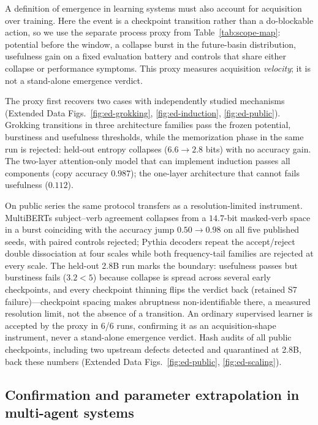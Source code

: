 \documentclass[11pt]{article}
\theoremstyle{definition}
\begin{document}
A definition of emergence in learning systems must also account for
acquisition over training. Here the event is a checkpoint transition rather
than a do-blockable action, so we use the separate process proxy from
Table~\ref{tab:scope-map}: potential before the window, a collapse burst in
the future-basin distribution, usefulness gain on a fixed evaluation
battery and controls that share either collapse or performance symptoms.
This proxy measures acquisition \emph{velocity}; it is not a stand-alone
emergence verdict.

The proxy first recovers two cases with independently studied
mechanisms (Extended Data Figs.~\ref{fig:ed-grokking},
\ref{fig:ed-induction}, \ref{fig:ed-public}). Grokking transitions in
three architecture families pass the frozen potential, burstiness and
usefulness thresholds, while the memorization phase in the same run is
rejected: held-out entropy collapses ($6.6\to2.8$ bits) with no
accuracy gain. The two-layer attention-only model that can implement
induction passes all components (copy accuracy $0.987$); the one-layer
architecture that cannot fails usefulness ($0.112$).

On public series the same protocol transfers as a resolution-limited
instrument. MultiBERTs subject--verb agreement collapses from a
$14.7$-bit masked-verb space in a burst coinciding with the accuracy
jump $0.50\to0.98$ on all five published seeds, with paired controls
rejected; Pythia decoders repeat the accept/reject double dissociation
at four scales while both frequency-tail families are rejected at
every scale. The held-out 2.8B run marks the boundary: usefulness
passes but burstiness fails ($3.2<5$) because collapse is spread
across several early checkpoints, and every checkpoint thinning flips
the verdict back (retained S7 failure)---checkpoint spacing makes
abruptness non-identifiable there, a measured resolution limit, not
the absence of a transition. An ordinary supervised learner is
accepted by the proxy in 6/6 runs, confirming it as an
acquisition-shape instrument, never a stand-alone emergence verdict.
Hash audits of all public checkpoints, including two upstream defects
detected and quarantined at 2.8B, back these numbers (Extended Data
Figs.~\ref{fig:ed-public}, \ref{fig:ed-scaling}).

\subsection*{Confirmation and parameter extrapolation in multi-agent systems}
\label{sec:marl}
\end{document}
